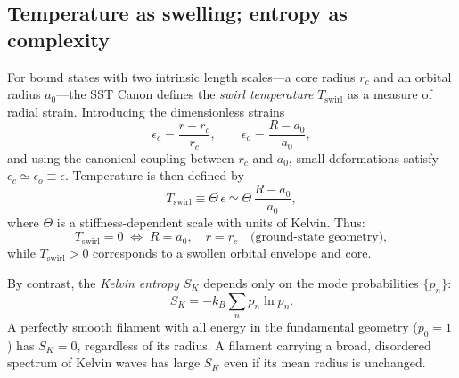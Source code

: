 \documentclass[11pt]{article}
\newcommand{\rc}{r_c}                                    %
\begin{document}
        \subsection{Temperature as swelling; entropy as complexity}
            \label{subsec:temperature-vs-entropy}

            For bound states with two intrinsic length scales---a core radius
            $\rc$ and an orbital radius $a_0$---the SST Canon defines the
            \emph{swirl temperature} $T_{\text{swirl}}$ as a measure of radial
            strain.
            Introducing the dimensionless strains
            \begin{equation}
                \epsilon_c = \frac{r - \rc}{\rc},
                \qquad
                \epsilon_o = \frac{R - a_0}{a_0},
            \end{equation}
            and using the canonical coupling between $\rc$ and $a_0$, small
            deformations satisfy $\epsilon_c \simeq \epsilon_o \equiv \epsilon$.
            Temperature is then defined by
            \begin{equation}
                T_{\text{swirl}} \equiv \Theta\,\epsilon
                \simeq \Theta\,\frac{R - a_0}{a_0},
                \label{eq:Tswirl-def}
            \end{equation}
            where $\Theta$ is a stiffness-dependent scale with units of Kelvin.
            Thus:
            \begin{equation}
                T_{\text{swirl}} = 0
                \;\Longleftrightarrow\;
                R = a_0,\quad r=\rc
                \quad\text{(ground-state geometry)},
            \end{equation}
            while $T_{\text{swirl}}>0$ corresponds to a swollen orbital envelope
            and core.

            By contrast, the \emph{Kelvin entropy} $S_K$ depends only on the mode
            probabilities $\{p_n\}$:
            \begin{equation}
                S_K = -k_B \sum_n p_n \ln p_n.
                \label{eq:kelvin-entropy}
            \end{equation}
            A perfectly smooth filament with all energy in the fundamental
            geometry ($p_0 = 1$) has $S_K=0$, regardless of its radius.
            A filament carrying a broad, disordered spectrum of Kelvin waves has
            large $S_K$ even if its mean radius is unchanged.
\end{document}
